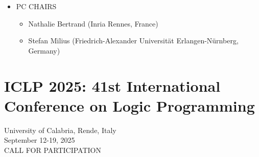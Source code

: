 \documentclass[prodmode,acmtecs]{acmsmall} %
\begin{document}
\begin{itemize}
\item  PC CHAIRS 
 
\begin{itemize}\item  Nathalie Bertrand (Inria Rennes, France)
\item  Stefan Milius (Friedrich-Alexander Universität Erlangen-Nürnberg, Germany)
\end{itemize} 
\end{itemize}\section{ICLP 2025: 41st International Conference on Logic Programming }\label{ICLP2025}  University of Calabria, Rende, Italy\\ 
  September 12-19, 2025\\ 
CALL FOR PARTICIPATION 
\end{document}
